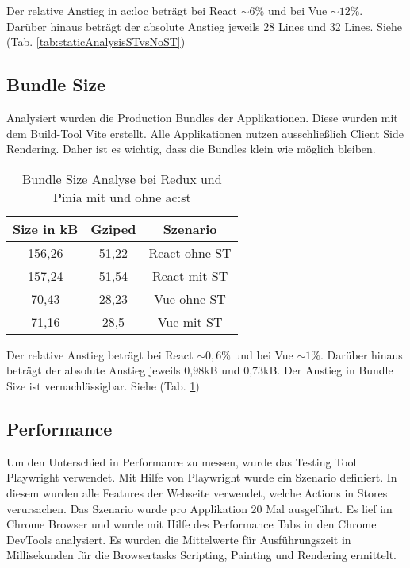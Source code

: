 Der relative Anstieg in \acrshort{ac:loc} beträgt bei React $\sim6\%$ und bei Vue $\sim12\%$. Darüber hinaus beträgt der absolute Anstieg jeweils 28 Lines und 32 Lines. Siehe (Tab. \ref{tab:staticAnalysisSTvsNoST})

\subsection{Bundle Size}

Analysiert wurden die Production Bundles der Applikationen. Diese wurden mit dem Build-Tool Vite erstellt. Alle Applikationen nutzen ausschließlich Client Side Rendering. Daher ist es wichtig, dass die Bundles klein wie möglich bleiben.

\begin{table}[!ht]
  \caption{Bundle Size Analyse bei Redux und Pinia mit und ohne \acrshort{ac:st}}
  \label{tab:bundleSizeAnalysisSTvsNoST}

  \begin{center}
    \begin{tabular}{|c|c|c|} 
    \hline
    Size in kB & Gziped & Szenario \\ [0.5ex]
    \hline\hline
    156,26 & 51,22 & React ohne ST \\
    \hline
    157,24 & 51,54 & React mit ST \\
    \hline
    70,43 & 28,23 & Vue ohne ST \\
    \hline
    71,16 & 28,5 & Vue mit ST \\
    \hline
    \end{tabular}
  \end{center}
\end{table}

Der relative Anstieg beträgt bei React $\sim0,6\%$ und bei Vue $\sim1\%$. Darüber hinaus beträgt der absolute Anstieg jeweils 0,98kB und 0,73kB. Der Anstieg in Bundle Size ist vernachlässigbar. Siehe (Tab. \ref{tab:bundleSizeAnalysisSTvsNoST})

\subsection{Performance}

Um den Unterschied in Performance zu messen, wurde das Testing Tool Playwright verwendet. Mit Hilfe von Playwright wurde ein Szenario definiert. In diesem wurden alle Features der Webseite verwendet, welche Actions in Stores verursachen. Das Szenario wurde pro Applikation 20 Mal ausgeführt. Es lief im Chrome Browser und wurde mit Hilfe des Performance Tabs in den Chrome DevTools analysiert. Es wurden die Mittelwerte für Ausführungszeit in Millisekunden für die Browsertasks Scripting, Painting und Rendering ermittelt.

